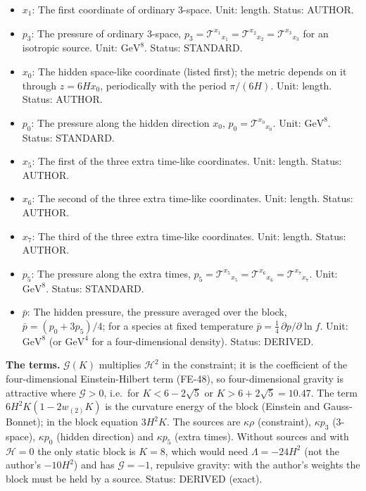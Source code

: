 \documentclass[
  10pt,
]{article}
\begin{document}
\begin{itemize}
  dimensions), \(\mathrm{GeV}^{4}\) (four dimensions). Status: STANDARD.
\item
  \(x_1\): The first coordinate of ordinary 3-space. Unit: length.
  Status: AUTHOR.
\item
  \(p_3\): The pressure of ordinary 3-space,
  \(p_3 = \mathcal{T}^{x_1}{}_{x_1} = \mathcal{T}^{x_2}{}_{x_2} = \mathcal{T}^{x_3}{}_{x_3}\)
  for an isotropic source. Unit: \(\mathrm{GeV}^{8}\). Status: STANDARD.
\item
  \(x_0\): The hidden space-like coordinate (listed first); the metric
  depends on it through \(z = 6Hx_0\), periodically with the period
  \(\pi/(6H)\). Unit: length. Status: AUTHOR.
\item
  \(p_0\): The pressure along the hidden direction \(x_0\),
  \(p_0 = \mathcal{T}^{x_0}{}_{x_0}\). Unit: \(\mathrm{GeV}^{8}\).
  Status: STANDARD.
\item
  \(x_5\): The first of the three extra time-like coordinates. Unit:
  length. Status: AUTHOR.
\item
  \(x_6\): The second of the three extra time-like coordinates. Unit:
  length. Status: AUTHOR.
\item
  \(x_7\): The third of the three extra time-like coordinates. Unit:
  length. Status: AUTHOR.
\item
  \(p_5\): The pressure along the extra times,
  \(p_5 = \mathcal{T}^{x_5}{}_{x_5} = \mathcal{T}^{x_6}{}_{x_6} = \mathcal{T}^{x_7}{}_{x_7}\).
  Unit: \(\mathrm{GeV}^{8}\). Status: STANDARD.
\item
  \(\bar p\): The hidden pressure, the pressure averaged over the block,
  \(\bar p = (p_0 + 3p_5)/4\); for a species at fixed temperature
  \(\bar p = \frac14\,\partial p/\partial\ln f\). Unit:
  \(\mathrm{GeV}^{8}\) (or \(\mathrm{GeV}^{4}\) for a four-dimensional
  density). Status: DERIVED.
\end{itemize}

\textbf{The terms.} \(\mathcal{G}(K)\) multiplies \(\mathcal{H}^2\) in
the constraint; it is the coefficient of the four-dimensional
Einstein-Hilbert term (FE-48), so four-dimensional gravity is attractive
where \(\mathcal{G} > 0\), i.e.~for \(K < 6 - 2\sqrt5\) or
\(K > 6 + 2\sqrt5 = 10.47\). The term \(6H^2K(1 - 2w_{(2)}K)\) is the
curvature energy of the block (Einstein and Gauss-Bonnet); in the block
equation \(3H^2K\). The sources are \(\kappa\rho\) (constraint),
\(\kappa p_3\) (3-space), \(\kappa p_0\) (hidden direction) and
\(\kappa p_5\) (extra times). Without sources and with
\(\mathcal{H} = 0\) the only static block is \(K = 8\), which would need
\(\Lambda = -24H^2\) (not the author's \(-10H^2\)) and has
\(\mathcal{G} = -1\), repulsive gravity: with the author's weights the
block must be held by a source. Status: DERIVED (exact).
\end{document}

